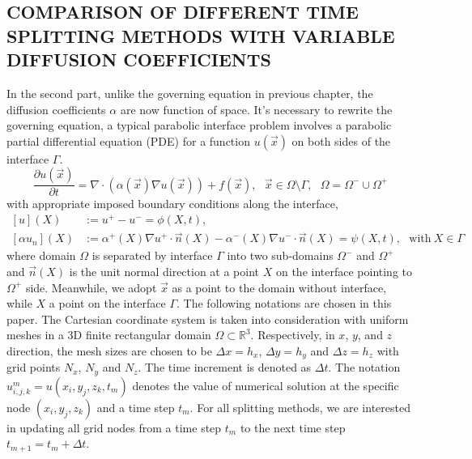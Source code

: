 \documentclass[dissertation]{uathesis}
\begin{document}
\begin{body}
\chapter{\MakeUppercase{Comparison of different time splitting methods with variable diffusion coefficients}}

In the second part, unlike the governing equation in previous chapter, the diffusion coefficients $\alpha$ are now function of space. It's necessary to rewrite the governing equation, a typical parabolic interface problem involves a parabolic partial differential equation (PDE) for a function $u(\vec x)$ on both sides of the interface $\Gamma$.
%
\begin{equation}\label{heat_eqn_3}
\frac{\partial u(\vec{x})}{\partial t} = \nabla \cdot (\alpha(\vec{x}) \nabla u(\vec{x})) + f(\vec{x}), ~~~ \vec{x} \in \Omega\setminus\Gamma, ~~~ \Omega =\Omega^{-} \cup \Omega^{+}
\end{equation}
%
with appropriate imposed boundary conditions along the interface, 
%
\begin{equation}\label{interface_jumps_3}
\begin{split}    
[u](X) &:= u^{+} - u^{-} = \phi(X,t), \\
[\alpha u_{n}](X) &:= \alpha^{+}(X) \nabla u^{+} \cdot \vec {n}(X) - \alpha^{-}(X) \nabla u^{-} \cdot \vec {n}(X) = \psi(X,t), ~~~ \mbox{with} ~ X \in \Gamma
\end{split}
\end{equation}
%
where domain $\Omega$ is separated by interface $\Gamma$ into two sub-domains $\Omega^{-}$ and $\Omega^{+}$ and $\vec n(X)$ is the unit normal direction at a point $X$ on the interface pointing to $\Omega^{+}$ side. Meanwhile, we adopt $\vec x$ as a point to the domain without interface, while $X$ a point on the interface $\Gamma$. The following notations are chosen in this paper. The Cartesian coordinate system is taken into consideration with uniform meshes in a 3D finite rectangular domain $\Omega \subset \mathbb{R}^{3}$. Respectively, in $x$, $y$, and $z$ direction, the mesh sizes are chosen to be $\Delta x=h_{x}$, $\Delta y=h_{y}$ and $\Delta z=h_{z}$ with grid points $N_{x}$, $N_{y}$ and $N_{z}$. The time increment is denoted as $\Delta t$. The notation $u^{m}_{i,j,k} = u(x_{i},y_{j},z_{k},t_{m})$ denotes the value of numerical solution at the specific node $(x_{i}, y_{j}, z_{k})$ and a time step $t_{m}$. For all splitting methods, we are interested in updating all grid nodes from a time step $t_{m}$ to the next time step $t_{m+1} = t_{m} + \Delta t$.
%

\end{body}
\end{document}
